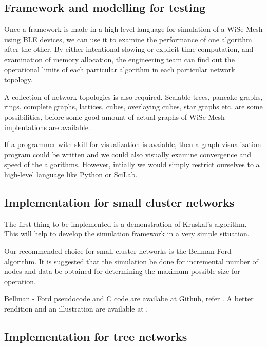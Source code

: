 \documentclass[fleqn,a4paper]{SelfArx}
\begin{document}
\subsection{Framework and modelling for testing}

\par Once a framework is made in a high-level language for simulation of a WiSe Mesh using BLE devices, we can use it to examine the performance
of one algorithm after the other. By either intentional slowing or explicit time computation, and examination of memory allocation, 
the engineering team can find out the operational limits of each particular algorithm in each particular network topology. 

\par A collection of network topologies is also required. Scalable trees, pancake graphs, rings, complete graphs, lattices, cubes, overlaying cubes, 
star graphs etc. are some possibilities, before some good amount of actual graphs of WiSe Mesh implentations are available.

\par If a programmer with skill for visualization is avaiable, then a graph visualization program could be written and we could also visually
examine convergence and speed of the algorithms. However, intially we would simply restrict ourselves to a high-level language like Python or SciLab.

\subsection{Implementation for small cluster networks}

\par The first thing to be implemented is a demonstration of Kruskal's algorithm. This will help to develop the simulation framework in a very
simple situation.

\par Our recommended choice for small cluster networks is the Bellman-Ford algorithm. It is suggested that the simulation be done 
for incremental number of nodes and data be obtained for determining the maximum possible size for operation.

\par Bellman - Ford pseudocode and C code are availabe at Github, refer \cite{Lu:Github}. A better rendition and an illustration are available at
\cite{Micka:algoritmy}.

\subsection{Implementation for tree networks}
\end{document}
